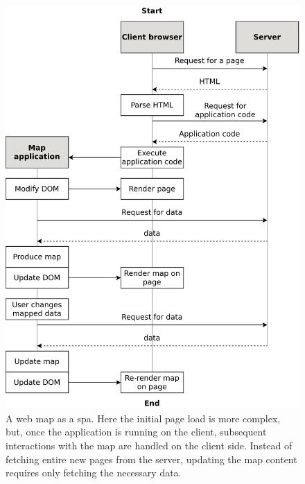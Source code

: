 \begin{figure}[H]
	\centering
	\includegraphics[width=\diagramwidth]{visual/figures/diagrams/spa.png}
	\caption{
		A web map as a \acrshort{spa}. Here the initial page load is more complex,
		but, once the application is running on the client,
		subsequent interactions with the map are handled on the client side.
		Instead of fetching entire new pages from the server,
		updating the map content requires only fetching the necessary data.
	}
	\label{fig:spa}
\end{figure}

